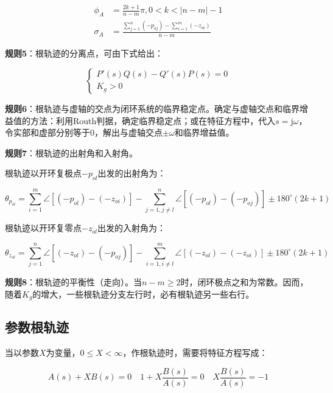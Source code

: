 \documentclass[cn, blue, normal, 12pt]{elegantnote}
\begin{document}
\begin{equation}
    \begin{aligned}
        \phi_A&=\frac{2k+1}{n-m}\pi, 0<k<|n-m|-1 \\
        \sigma_A&=\frac{\sum\limits_{j=1}^{n}(-p_{oj})-\sum\limits_{i=1}^{m}(-z_{oi})}{n-m}
    \end{aligned}
\end{equation}

\textbf{规则5}：根轨迹的分离点，可由下式给出：

\begin{equation}
    \left\{
        \begin{array}{l}
            P'(s)Q(s)-Q'(s)P(s)=0 \\
            K_g>0
        \end{array}
    \right.
\end{equation}

\textbf{规则6}：根轨迹与虚轴的交点为闭环系统的临界稳定点。确定与虚轴交点和临界增益值的方法：利用Routh判据，确定临界稳定点；或在特征方程中，代入$s=\mathrm{j}\omega$，令实部和虚部分别等于0，解出与虚轴交点$±\omega$和临界增益值。

\textbf{规则7}：根轨迹的出射角和入射角。

根轨迹以开环复极点$-p_{ol}$出发的出射角为：

\begin{equation}
    \theta_{p_{ol}}=\sum_{i=1}^{m}\angle[(-p_{ol})-(-z_{oi})]-\sum_{j=1,j\neq l}^{n}\angle[(-p_{ol})-(-p_{oj})]\pm 180^{\circ}(2k+1)
\end{equation}

根轨迹以开环复零点$-z_{ol}$出发的入射角为：

\begin{equation}
    \theta_{z_{ol}}=\sum_{j=1}^{n}\angle[(-z_{ol})-(-p_{oj})]-\sum_{i=1,i\neq l}^{m}\angle[(-z_{ol})-(-z_{oi})]\pm 180^{\circ}(2k+1)
\end{equation}

\textbf{规则8}：根轨迹的平衡性（走向）。当$n-m\geq 2$时，闭环极点之和为常数。因而，随着$K_g$的增大，一些根轨迹分支左行时，必有根轨迹另一些右行。

\subsection{参数根轨迹}

当以参数$X$为变量，$0\leq X<\infty$，作根轨迹时，需要将特征方程写成：

\begin{equation}
    A(s)+XB(s)=0 \quad 1+X\frac{B(s)}{A(s)}=0 \quad X\frac{B(s)}{A(s)}=-1
\end{equation}
\end{document}
